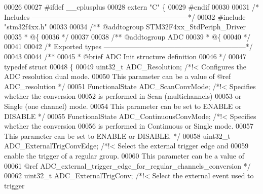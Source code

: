 \begin{DoxyCode}
00026 
00027 \textcolor{preprocessor}{#}\textcolor{preprocessor}{ifdef} \_\_cplusplus
00028  \textcolor{keyword}{extern} \textcolor{stringliteral}{"C"} \{
00029 \textcolor{preprocessor}{#}\textcolor{preprocessor}{endif}
00030 
00031 \textcolor{comment}{/* Includes ------------------------------------------------------------------*/}
00032 \textcolor{preprocessor}{#}\textcolor{preprocessor}{include} "stm32f4xx.h"
00033 
00034 \textcolor{comment}{/** @addtogroup STM32F4xx\_StdPeriph\_Driver}
00035 \textcolor{comment}{  * @\{}
00036 \textcolor{comment}{  */}
00037 
00038 \textcolor{comment}{/** @addtogroup ADC}
00039 \textcolor{comment}{  * @\{}
00040 \textcolor{comment}{  */}
00041 
00042 \textcolor{comment}{/* Exported types ------------------------------------------------------------*/}
00043 
00044 \textcolor{comment}{/** }
00045 \textcolor{comment}{  * @brief   ADC Init structure definition  }
00046 \textcolor{comment}{  */}
00047 \textcolor{keyword}{typedef} \textcolor{keyword}{struct}
00048 \{
00049   uint32\_t ADC_Resolution;                \textcolor{comment}{/*!< Configures the ADC resolution dual mode. }
00050 \textcolor{comment}{                                               This parameter can be a value of @ref ADC\_resolution */}
00051   FunctionalState ADC_ScanConvMode;       \textcolor{comment}{/*!< Specifies whether the conversion }
00052 \textcolor{comment}{                                               is performed in Scan (multichannels) }
00053 \textcolor{comment}{                                               or Single (one channel) mode.}
00054 \textcolor{comment}{                                               This parameter can be set to ENABLE or DISABLE */}
00055   FunctionalState ADC_ContinuousConvMode; \textcolor{comment}{/*!< Specifies whether the conversion }
00056 \textcolor{comment}{                                               is performed in Continuous or Single mode.}
00057 \textcolor{comment}{                                               This parameter can be set to ENABLE or DISABLE. */}
00058   uint32\_t ADC_ExternalTrigConvEdge;      \textcolor{comment}{/*!< Select the external trigger edge and}
00059 \textcolor{comment}{                                               enable the trigger of a regular group. }
00060 \textcolor{comment}{                                               This parameter can be a value of }
00061 \textcolor{comment}{                                               @ref
       ADC\_external\_trigger\_edge\_for\_regular\_channels\_conversion */}
00062   uint32\_t ADC_ExternalTrigConv;          \textcolor{comment}{/*!< Select the external event used to trigger }

\end{DoxyCode}
